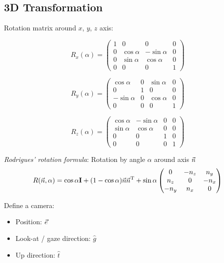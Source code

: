 
% 



\subsection{3D Transformation}

Rotation matrix around $x$, $y$, $z$ axis:

$$R_x(\alpha) = \begin{pmatrix}
    1 & 0 & 0 & 0 \\
    0 & \cos\alpha & -\sin\alpha & 0 \\
    0 & \sin\alpha & \cos\alpha & 0 \\
    0 & 0 & 0 & 1
\end{pmatrix}$$

$$R_y(\alpha) = \begin{pmatrix}
    \cos\alpha & 0 & \sin\alpha & 0 \\
    0 & 1 & 0 & 0 \\
    -\sin\alpha & 0 & \cos\alpha & 0 \\
    0 & 0 & 0 & 1
\end{pmatrix}$$

$$R_z(\alpha) = \begin{pmatrix}
    \cos\alpha & -\sin\alpha & 0 & 0 \\
    \sin\alpha & \cos\alpha & 0 & 0 \\
    0 & 0 & 1 & 0 \\
    0 & 0 & 0 & 1
\end{pmatrix}$$

\emph{Rodrigues' rotation formula}: Rotation by angle $\alpha$ around axis $\vec{n}$
$$R(\vec{n}, \alpha) = \cos\alpha \mathbf{I} + (1 - \cos\alpha)\vec{n}\vec{n}^\mathrm{T} + \sin\alpha\begin{pmatrix}
    0 & -n_z & n_y \\
    n_z & 0 & -n_x \\
    -n_y & n_x & 0
\end{pmatrix}$$

Define a camera:
\begin{itemize}
    \item Position: $\vec{e}$
    \item Look-at / gaze direction: $\hat g$
    \item Up direction: $\hat t$
\end{itemize}

